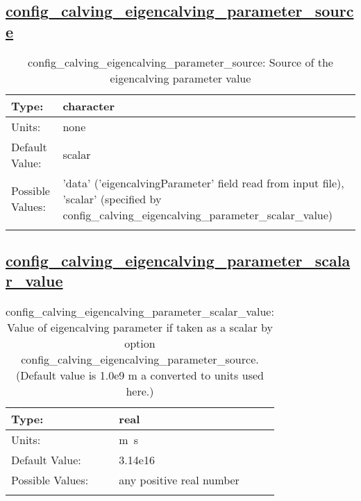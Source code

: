 \subsection[config\_calving\_eigencalving\_parameter\_source]{\hyperref[sec:nm_tab_calving]{config\_calving\_eigencalving\_parameter\_source}}
\label{subsec:nm_sec_config_calving_eigencalving_parameter_source}
\begin{center}
\begin{longtable}{| p{2.0in} || p{4.0in} |}
    \hline
    Type: & character \\
    \hline
    Units: & \si{none} \\
    \hline
    Default Value: & scalar \\
    \hline
    Possible Values: & 'data' ('eigencalvingParameter' field read from input file), 'scalar' (specified by config\_calving\_eigencalving\_parameter\_scalar\_value) \\
    \hline
    \caption{config\_calving\_eigencalving\_parameter\_source: Source of the eigencalving parameter value}
\end{longtable}
\end{center}
\subsection[config\_calving\_eigencalving\_parameter\_scalar\_value]{\hyperref[sec:nm_tab_calving]{config\_calving\_eigencalving\_parameter\_scalar\_value}}
\label{subsec:nm_sec_config_calving_eigencalving_parameter_scalar_value}
\begin{center}
\begin{longtable}{| p{2.0in} || p{4.0in} |}
    \hline
    Type: & real \\
    \hline
    Units: & \si{m.s} \\
    \hline
    Default Value: & 3.14e16 \\
    \hline
    Possible Values: & any positive real number \\
    \hline
    \caption{config\_calving\_eigencalving\_parameter\_scalar\_value: Value of eigencalving parameter if taken as a scalar by option config\_calving\_eigencalving\_parameter\_source. (Default value is 1.0e9 m a converted to units used here.)}
\end{longtable}
\end{center}
